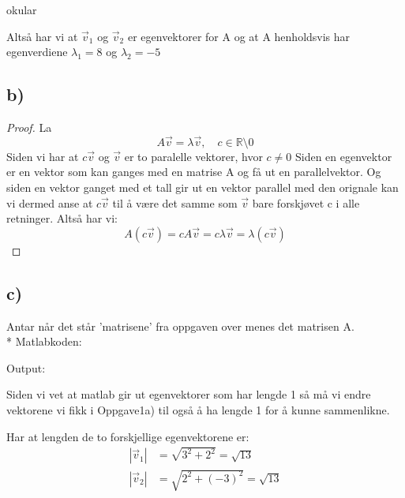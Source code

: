 okular\documentclass[a4paper, norsk, twoside, 10pt]{article}
\begin{document}
Altså har vi at $\vec{v}_{1}$ og $\vec{v}_{2}$ er egenvektorer for A og at A henholdsvis har egenverdiene $\lambda_{1} = 8$ og $\lambda_{2} = -5$




\subsection*{b)}
\begin{proof}
La \[A\vec{v} = \lambda\vec{v}, \quad c \in \mathbb{R}\setminus{0}\]
Siden vi har at $c\vec{v}$ og $\vec{v}$ er to paralelle vektorer, hvor $c \ne 0$ Siden en egenvektor er en vektor som kan ganges med en matrise A og få ut en parallelvektor. Og siden en vektor ganget med et tall gir ut en vektor parallel med den orignale kan vi dermed anse at $c\vec{v}$ til å være det samme som $\vec{v}$ bare forskjøvet c i alle retninger. Altså har vi:
\[A(c\vec{v}) = cA\vec{v} = c\lambda\vec{v} = \lambda(c\vec{v})\]
\end{proof}





\subsection*{c)}
Antar når det står 'matrisene' fra oppgaven over menes det matrisen A. \\*
Matlabkoden:

Output:


Siden vi vet at matlab gir ut egenvektorer som har lengde 1 så må vi endre vektorene vi fikk i Oppgave1a) til også å ha lengde 1 for å kunne sammenlikne.

Har at lengden de to forskjellige egenvektorene er:
\[\begin{split}|\vec{v}_{1}| &= \sqrt{3^{2} + 2^{2}} = \sqrt{13}\\
|\vec{v}_{2}| &= \sqrt{2^{2} + (-3)^{2}} = \sqrt{13}\end{split}\]
\end{document}
